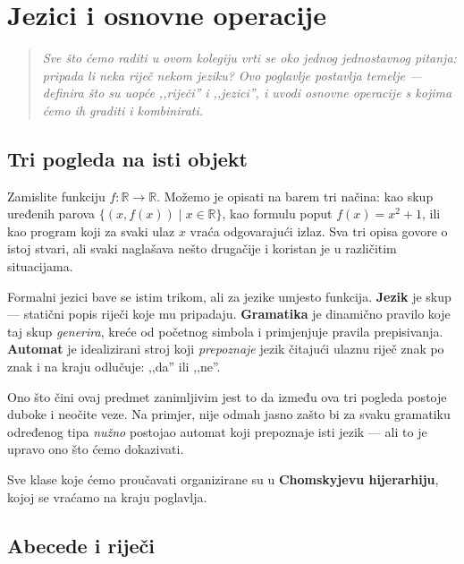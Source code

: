 \chapter{Jezici i osnovne operacije}
\label{chap:1}

\begin{quote}
\itshape
Sve što ćemo raditi u ovom kolegiju vrti se oko jednog jednostavnog pitanja:
pripada li neka riječ nekom jeziku? Ovo poglavlje postavlja temelje ---
definira što su uopće ,,riječi'' i ,,jezici'', i uvodi osnovne operacije s
kojima ćemo ih graditi i kombinirati.
\end{quote}


\section{Tri pogleda na isti objekt}

Zamislite funkciju $f : \mathbb{R} \to \mathbb{R}$. Možemo je opisati na
barem tri načina: kao skup uređenih parova $\{(x, f(x)) \mid x \in \mathbb{R}\}$,
kao formulu poput $f(x) = x^2 + 1$, ili kao program koji za svaki ulaz $x$
vraća odgovarajući izlaz. Sva tri opisa govore o istoj stvari, ali svaki naglašava
nešto drugačije i koristan je u različitim situacijama.

Formalni jezici bave se istim trikom, ali za jezike umjesto funkcija.
\textbf{Jezik} je skup --- statični popis riječi koje mu pripadaju.
\textbf{Gramatika} je dinamično pravilo koje taj skup \emph{generira},
kreće od početnog simbola i primjenjuje pravila prepisivanja.
\textbf{Automat} je idealizirani stroj koji \emph{prepoznaje} jezik čitajući
ulaznu riječ znak po znak i na kraju odlučuje: ,,da'' ili ,,ne''.

Ono što čini ovaj predmet zanimljivim jest to da između ova tri pogleda
postoje duboke i neočite veze. Na primjer, nije odmah jasno zašto bi za svaku
gramatiku određenog tipa \emph{nužno} postojao automat koji prepoznaje isti
jezik --- ali to je upravo ono što ćemo dokazivati.

Sve klase koje ćemo proučavati organizirane su u \textbf{Chomskyjevu hijerarhiju},
kojoj se vraćamo na kraju poglavlja.

\section{Abecede i riječi}

